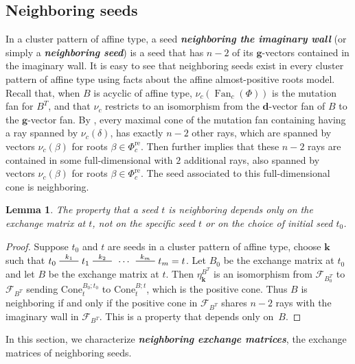 \documentclass{amsart}
\newtheorem{lemma}[proposition]{Lemma}
\theoremstyle{definition}
\theoremstyle{remark}
\numberwithin{equation}{section}
\newcommand{\newword}[1]{\textbf{\emph{#1}}}
\newcommand{\edge}{\,\,\rule[2.7pt]{20pt}{0.5pt}\,\,}
\newcommand{\F}{{\mathcal F}}
\newcommand{\0}{{\mathbf{0}}}
\newcommand{\Cone}{\mathrm{Cone}}
\newcommand{\g}{\mathbf{g}}
\newcommand{\kk}{{\boldsymbol{k}}}
\newcommand{\Fan}{\operatorname{Fan}}
\newcommand{\re}{\mathrm{re}}
\newcommand{\dd}{{\mathbf d}}
\newcommand{\RSChar}{\Phi}
\newcommand{\RS}{\RSChar}
\newcommand{\AP}[1]{\RS_{#1}}
\newcommand{\APre}[1]{\AP{#1}^\re}
\begin{document}
\subsection{Neighboring seeds}\label{neigh sec}
In a cluster pattern of affine type, a seed \newword{neighboring the imaginary wall} (or simply a \newword{neighboring seed}) is a seed that has $n-2$ of its $\g$-vectors contained in the imaginary wall.
It is easy to see that neighboring seeds exist in every cluster pattern of affine type using facts about the affine almost-positive roots model.
Recall that, when $B$ is acyclic of affine type, $\nu_c(\Fan_c(\RS))$ is the mutation fan for $B^T$, and that $\nu_c$ restricts to an isomorphism from the $\dd$-vector fan of $B$ to the $\g$-vector fan.
By \cite[Proposition~5.14]{affdenom}, every maximal cone of the mutation fan containing having a ray spanned by $\nu_c(\delta)$, has exactly $n-2$ other rays, which are spanned by vectors $\nu_c(\beta)$ for roots $\beta\in\APre{c}$.
Then \cite[Proposition~5.14]{affdenom} further implies that these $n-2$ rays are contained in some full-dimensional with $2$ additional rays, also spanned by vectors $\nu_c(\beta)$ for roots $\beta\in\APre{c}$.
The seed associated to this full-dimensional cone is neighboring.

\begin{lemma}\label{neigh B only}
The property that a seed $t$ is neighboring depends only on the exchange matrix at $t$, not on the specific seed $t$ or on the choice of initial seed $t_0$.
\end{lemma}
\begin{proof}
Suppose $t_0$ and $t$ are seeds in a cluster pattern of affine type, choose $\kk$ such that $t_0\overset{k_1}{\edge}t_1\overset{k_2}{\edge}\,\cdots\,\overset{k_m}{\edge}t_m=t$.
Let $B_0$ be the exchange matrix at $t_0$ and let $B$ be the exchange matrix at $t$.
Then $\eta^{B^T}_\kk$ is an isomorphism from $\F_{B_0^T}$ to $\F_{B^T}$ sending $\Cone_t^{B_0;t_0}$ to $\Cone_t^{B;t}$, which is the positive cone.
Thus $B$ is neighboring if and only if the positive cone in $\F_{B^T}$ shares $n-2$ rays with the imaginary wall in $\F_{B^T}$.
This is a property that depends only on~$B$.
\end{proof}

In this section, we characterize \newword{neighboring exchange matrices}, the exchange matrices of neighboring seeds.
\end{document}
